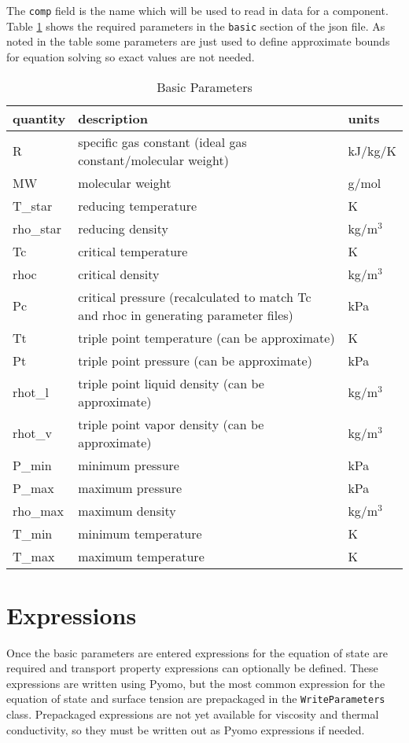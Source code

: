 \documentclass[oneside]{book}
\begin{document}
The \texttt{comp} field is the name which will be used to read in data for a component. Table \ref{table:basic_params} shows the required parameters in the \texttt{basic} section of the json file. As noted in the table some parameters are just used to define approximate bounds for equation solving so exact values are not needed. 

\begin{table}[h!]
\centering
\caption{Basic Parameters}
\begin{tabular}{ l l l }
\hline
quantity & description & units\\
\hline
\hline
R & specific gas constant (ideal gas constant/molecular weight) & kJ/kg/K \\[1ex]
MW &molecular weight & g/mol \\[1ex] 
T\_star & reducing temperature & K \\[1ex] 
rho\_star & reducing density & kg/m$^3$ \\[1ex] 
Tc & critical temperature & K \\[1ex]
rhoc & critical density & kg/m$^3$ \\[1ex]
Pc & critical pressure (recalculated to match Tc and rhoc in generating parameter files) & kPa \\[1ex]
Tt & triple point temperature (can be approximate) & K \\[1ex]
Pt & triple point pressure (can be approximate) & kPa \\[1ex]
rhot\_l & triple point liquid density (can be approximate) & kg/m$^3$ \\[1ex]
rhot\_v & triple point vapor density (can be approximate) & kg/m$^3$ \\[1ex]
P\_min & minimum pressure & kPa \\[1ex]
P\_max & maximum pressure & kPa \\[1ex]
rho\_max & maximum density & kg/m$^3$ \\[1ex]
T\_min & minimum temperature & K \\[1ex]
T\_max & maximum temperature & K \\[1ex]
 \hline    
\end{tabular}
\label{table:basic_params}
\end{table}

\section{Expressions}

Once the basic parameters are entered expressions for the equation of state are required and transport property expressions can optionally be defined.  These expressions are written using Pyomo, but the most common expression for the equation of state and surface tension are prepackaged in the \texttt{WriteParameters} class. Prepackaged expressions are not yet available for viscosity and thermal conductivity, so they must be written out as Pyomo expressions if needed. 
\end{document}

